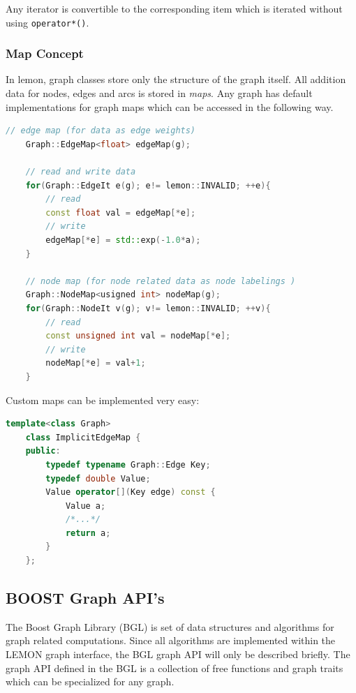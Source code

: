     Any iterator is convertible to the corresponding item which
    is iterated without using \lstinline{operator*()}.

\subsubsection{Map Concept}

    In lemon, graph classes store only the structure of the graph itself.
    All addition data for nodes, edges and arcs is stored 
    in \emph{maps}. 
    Any graph has default implementations for graph maps which
    can be accessed in the following way.

    \begin{minipage}{\textwidth}\vspace{-0.75cm}\begin{lstlisting}[language=c++]
    // edge map (for data as edge weights)
    Graph::EdgeMap<float> edgeMap(g); 

    // read and write data 
    for(Graph::EdgeIt e(g); e!= lemon::INVALID; ++e){
        // read
        const float val = edgeMap[*e];
        // write
        edgeMap[*e] = std::exp(-1.0*a);
    }

    // node map (for node related data as node labelings )
    Graph::NodeMap<usigned int> nodeMap(g);
    for(Graph::NodeIt v(g); v!= lemon::INVALID; ++v){
        // read
        const unsigned int val = nodeMap[*e];
        // write
        nodeMap[*e] = val+1;
    }
    \end{lstlisting}\end{minipage}\vspace{0.5cm}


    Custom maps can be implemented very easy:

    \begin{minipage}{\textwidth}\vspace{-0.75cm}\begin{lstlisting}[language=c++]
    template<class Graph>
    class ImplicitEdgeMap {
    public:
        typedef typename Graph::Edge Key;
        typedef double Value;
        Value operator[](Key edge) const { 
            Value a;
            /*...*/
            return a;
        }
    };
    \end{lstlisting}\end{minipage}\vspace{0.5cm}

\subsection{BOOST Graph API's}\label{sec:boost_graph_apis}
The Boost Graph Library (BGL)  \cite{software_bgl} is set of data structures and 
algorithms for graph related computations.
Since all algorithms are implemented within the LEMON graph interface, 
the BGL graph API will only be described briefly.
The graph API defined in the BGL is a collection of
free functions and graph traits which can be specialized for
any graph.




